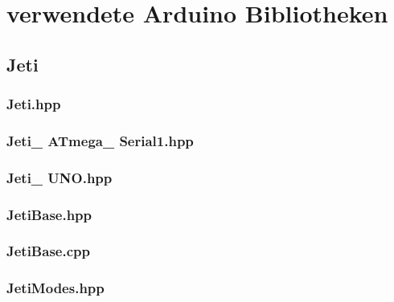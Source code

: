 \section{verwendete Arduino Bibliotheken}
\subsection{Jeti}
\subsubsection{Jeti.hpp}

\subsubsection{Jeti\_ ATmega\_ Serial1.hpp}

\subsubsection{Jeti\_ UNO.hpp}

\subsubsection{JetiBase.hpp}

\subsubsection{JetiBase.cpp}

\subsubsection{JetiModes.hpp}
